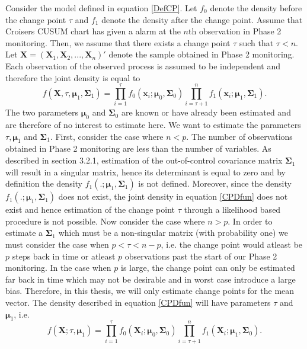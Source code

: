 Consider the model defined in equation \eqref{DefCP}. Let $f_0$ denote the density before the change point $\tau$ and $f_1$ denote the density after the change point. Assume that Croisers CUSUM chart has given a alarm at the $n$th observation in Phase 2 monitoring. Then, we assume that there exists a change point $\tau$ such that $\tau<n$. Let $\mathbf{X}=(\mathbf{X}_1,\mathbf{X}_2,...,\mathbf{X}_n)'$ denote the sample obtained in Phase 2 monitoring. Each observation of the observed process is assumed to be independent and therefore the joint density is equal to
\begin{equation}\label{CPDfun}
f(\mathbf{X},\tau,\boldsymbol{\mu}_1,\boldsymbol{\Sigma}_1) = \prod_{i=1}^{\tau} f_{0}(\mathbf{x}_i;\boldsymbol{\mu}_0,\boldsymbol{\Sigma}_0)\prod_{i=\tau+1}^{n}f_1(\mathbf{x}_i;\boldsymbol{\mu}_1,\boldsymbol{\Sigma}_1).
\end{equation}
The two parameters $\boldsymbol{\mu}_0$ and $\boldsymbol{\Sigma}_0$ are known or have already been estimated and are therefore of no interest to estimate here. We want to estimate the parameters $\tau,\boldsymbol{\mu}_1$ and $\boldsymbol{\Sigma}_1$. First, consider the case where $n<p$. The number of observations obtained in Phase 2 monitoring are less than the number of variables. As described in \citet{CPDbook} section 3.2.1, estimation of the out-of-control covariance matrix $\boldsymbol{\Sigma}_1$ will result in a singular matrix, hence its determinant is equal to zero and by definition the density $f_1(.;\boldsymbol{\mu}_1,\boldsymbol{\Sigma}_1)$ is not defined. Moreover, since the density $f_1(.;\boldsymbol{\mu}_1,\boldsymbol{\Sigma}_1)$ does not exist, the joint density in equation \eqref{CPDfun} does not exist and hence estimation of the change point $\tau$ through a likelihood based procedure is not possible. Now consider the case where $n>p$. In order to estimate a $\boldsymbol{\Sigma}_1$ which must be a non-singular matrix (with probability one) we must consider the case when $p<\tau<n-p$, i.e. the change point would atleast be $p$ steps back in time or atleast $p$ observations past the start of our Phase 2 monitoring. In the case when $p$ is large, the change point can only be estimated far back in time which may not be desirable and in worst case introduce a large bias. Therefore, in this thesis, we will only estimate change points for the mean vector. The density described in equation \eqref{CPDfun} will have parameters $\tau$ and $\boldsymbol{\mu}_1$, i.e.
\begin{equation}\label{CPDfunRed}
f(\mathbf{X};\tau,\boldsymbol{\mu}_1) = \prod_{i=1}^{\tau} f_{0}(\mathbf{X}_i;\boldsymbol{\mu}_0,\boldsymbol{\Sigma}_0)\prod_{i=\tau+1}^{n}f_1(\mathbf{X}_i;\boldsymbol{\mu}_1,\boldsymbol{\Sigma}_0).
\end{equation}
